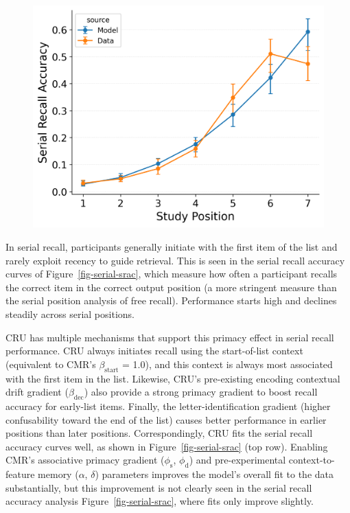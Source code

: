 \documentclass[
  man,
  floatsintext,
  longtable,
  nolmodern,
  notxfonts,
  notimes,
  draftfirst,
  colorlinks=true,linkcolor=blue,citecolor=blue,urlcolor=blue]{apa7}
\begin{document}
\begin{figure}
\begin{minipage}{0.33\linewidth}
\includegraphics{figures/Gordon2021_CRU_with_Pre-Expt_and_Primacy__and_ContextTerm_Confusable_Fitting_omission_error_rate_LL7.png}\end{minipage}%

\end{figure}%

In serial recall, participants generally initiate with the first item of
the list and rarely exploit recency to guide retrieval. This is seen in
the serial recall accuracy curves of Figure~\ref{fig-serial-srac}, which
measure how often a participant recalls the correct item in the correct
output position (a more stringent measure than the serial position
analysis of free recall). Performance starts high and declines steadily
across serial positions.

CRU has multiple mechanisms that support this primacy effect in serial
recall performance. CRU always initiates recall using the start-of-list
context (equivalent to CMR's \(\beta_\text{start}\) = 1.0), and this
context is always most associated with the first item in the list.
Likewise, CRU's pre-existing encoding contextual drift gradient
(\(\beta_\text{dec}\)) also provide a strong primacy gradient to boost
recall accuracy for early-list items. Finally, the letter-identification
gradient (higher confusability toward the end of the list) causes better
performance in earlier positions than later positions. Correspondingly,
CRU fits the serial recall accuracy curves well, as shown in
Figure~\ref{fig-serial-srac} (top row). Enabling CMR's associative
primacy gradient (\(\phi_\text{s}\), \(\phi_\text{d}\)) and
pre-experimental context-to-feature memory (\(\alpha\), \(\delta\))
parameters improves the model's overall fit to the data substantially,
but this improvement is not clearly seen in the serial recall accuracy
analysis Figure~\ref{fig-serial-srac}, where fits only improve slightly.
\end{document}
